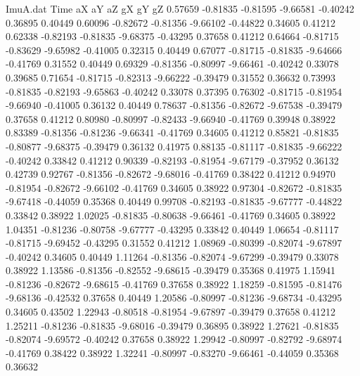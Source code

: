 \begin{filecontents}{ImuA.dat}
Time aX aY aZ gX gY gZ
   0.57659   -0.81835   -0.81595   -9.66581   -0.40242    0.36895    0.40449
   0.60096   -0.82672   -0.81356   -9.66102   -0.44822    0.34605    0.41212
   0.62338   -0.82193   -0.81835   -9.68375   -0.43295    0.37658    0.41212
   0.64664   -0.81715   -0.83629   -9.65982   -0.41005    0.32315    0.40449
   0.67077   -0.81715   -0.81835   -9.64666   -0.41769    0.31552    0.40449
   0.69329   -0.81356   -0.80997   -9.66461   -0.40242    0.33078    0.39685
   0.71654   -0.81715   -0.82313   -9.66222   -0.39479    0.31552    0.36632
   0.73993   -0.81835   -0.82193   -9.65863   -0.40242    0.33078    0.37395
   0.76302   -0.81715   -0.81954   -9.66940   -0.41005    0.36132    0.40449
   0.78637   -0.81356   -0.82672   -9.67538   -0.39479    0.37658    0.41212
   0.80980   -0.80997   -0.82433   -9.66940   -0.41769    0.39948    0.38922
   0.83389   -0.81356   -0.81236   -9.66341   -0.41769    0.34605    0.41212
   0.85821   -0.81835   -0.80877   -9.68375   -0.39479    0.36132    0.41975
   0.88135   -0.81117   -0.81835   -9.66222   -0.40242    0.33842    0.41212
   0.90339   -0.82193   -0.81954   -9.67179   -0.37952    0.36132    0.42739
   0.92767   -0.81356   -0.82672   -9.68016   -0.41769    0.38422    0.41212
   0.94970   -0.81954   -0.82672   -9.66102   -0.41769    0.34605    0.38922
   0.97304   -0.82672   -0.81835   -9.67418   -0.44059    0.35368    0.40449
   0.99708   -0.82193   -0.81835   -9.67777   -0.44822    0.33842    0.38922
   1.02025   -0.81835   -0.80638   -9.66461   -0.41769    0.34605    0.38922
   1.04351   -0.81236   -0.80758   -9.67777   -0.43295    0.33842    0.40449
   1.06654   -0.81117   -0.81715   -9.69452   -0.43295    0.31552    0.41212
   1.08969   -0.80399   -0.82074   -9.67897   -0.40242    0.34605    0.40449
   1.11264   -0.81356   -0.82074   -9.67299   -0.39479    0.33078    0.38922
   1.13586   -0.81356   -0.82552   -9.68615   -0.39479    0.35368    0.41975
   1.15941   -0.81236   -0.82672   -9.68615   -0.41769    0.37658    0.38922
   1.18259   -0.81595   -0.81476   -9.68136   -0.42532    0.37658    0.40449
   1.20586   -0.80997   -0.81236   -9.68734   -0.43295    0.34605    0.43502
   1.22943   -0.80518   -0.81954   -9.67897   -0.39479    0.37658    0.41212
   1.25211   -0.81236   -0.81835   -9.68016   -0.39479    0.36895    0.38922
   1.27621   -0.81835   -0.82074   -9.69572   -0.40242    0.37658    0.38922
   1.29942   -0.80997   -0.82792   -9.68974   -0.41769    0.38422    0.38922
   1.32241   -0.80997   -0.83270   -9.66461   -0.44059    0.35368    0.36632

\end{filecontents}
